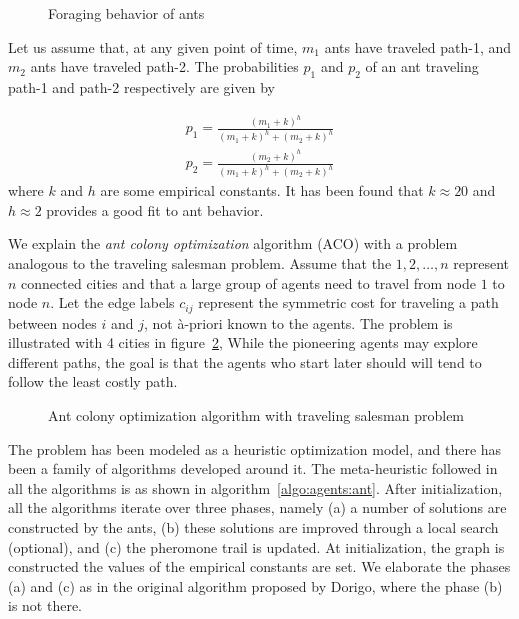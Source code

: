 \begin{figure}[!htpb]
	\centering
	\caption{Foraging behavior of ants}
	\label{fig:agents:ant1}
\end{figure}

Let us assume that, at any given point of time, $m_1$ ants have traveled path-1, and $m_2$ ants have traveled path-2. The 
probabilities $p_1$ and $p_2$ of an ant traveling path-1 and path-2 respectively are given by

\begin{align}
	p_1 = \frac{(m_1 + k)^h}{(m_1 + k)^h + (m_2 +k)^h} \\
	p_2 = \frac{(m_2 + k)^h}{(m_1 + k)^h + (m_2 +k)^h} 
\end{align}
\noindent
where $k$ and $h$ are some empirical constants. It has been found that $k \approx 20$ and $h \approx 2$ provides a good fit
to ant behavior.

We explain the {\em ant colony optimization} algorithm (ACO) with a problem analogous to the traveling salesman problem. Assume 
that the $1, 2, \dots, n$ represent $n$ connected cities and that a large group of agents need to travel from node $1$ to node $n$. 
Let the edge labels $c_{ij}$ represent the symmetric cost for traveling a path between nodes $i$ and $j$, not \`{a}-priori known 
to the agents. The problem is illustrated with 4 cities in figure~\ref{fig:agents:ant2}, While the pioneering agents may explore 
different paths, the goal is that the agents who start later should will tend to follow the least costly path.

\begin{figure}[!htpb]
	\centering
	\caption{Ant colony optimization algorithm with traveling salesman problem}
	\label{fig:agents:ant2}
\end{figure}

The problem has been modeled as a heuristic optimization model, and there has been a family of algorithms developed around it.
The meta-heuristic followed in all the algorithms is as shown in algorithm~\ref{algo:agents:ant}. After initialization, all 
the algorithms iterate over three phases, namely (a) a number of solutions are constructed by the ants, (b) these solutions are
improved through a local search (optional), and (c) the pheromone trail is updated. At initialization, the graph is constructed
the values of the empirical constants are set.  
We elaborate the phases (a) and (c) as in the original algorithm proposed by Dorigo, where the phase (b) is not there.


